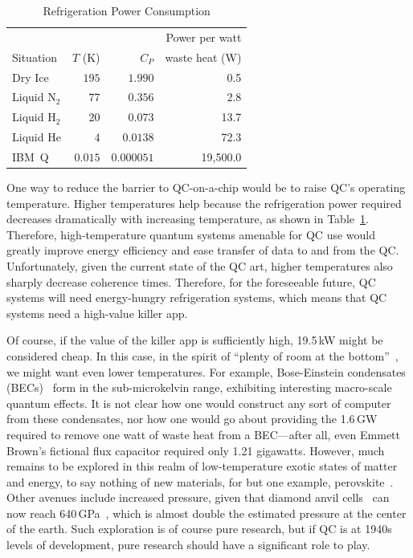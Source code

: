 \begin{table}
\centering\footnotesize
\begin{tabular}{l|r|r|r}
	&	&	& Power per watt \\
Situation
	& $T$ (K)
		& $C_P$	& waste heat (W) \\
\hline
\hline
Dry Ice
	& $195$
		& $1.990$
			& 0.5 \\
\hline
Liquid N$_2$
	& $77$
		& $0.356$
			& 2.8 \\
\hline
Liquid H$_2$
	& $20$
		& $0.073$
			& 13.7 \\
\hline
Liquid He
	& $4$
		& $0.0138$
			& 72.3 \\
\hline
IBM~Q	& $0.015$
		& $0.000051$
			& 19,500.0 \\
\end{tabular}
\caption{Refrigeration Power Consumption}
\label{tab:future:Refrigeration Power Consumption}
\end{table}

One way to reduce the barrier to QC-on-a-chip would be to raise
QC's operating temperature.
Higher temperatures help because the refrigeration power required
decreases dramatically with increasing temperature, as shown in
Table~\ref{tab:future:Refrigeration Power Consumption}.
Therefore, high-temperature quantum systems amenable for QC use would
greatly improve energy efficiency and ease transfer of data to and from
the QC.
Unfortunately, given the current state of the QC art, higher
temperatures also sharply decrease coherence times.
Therefore, for the foreseeable future, QC systems will need
energy-hungry refrigeration systems, which means that QC
systems need a high-value killer app.

Of course, if the value of the killer app is sufficiently high,
19.5\,kW might be considered cheap.
In this case, in the spirit of
``plenty of room at the bottom''~\cite{RichardPFeynman1959RoomAtBottom},
we might want even lower temperatures.
For example, Bose-Einstein condensates
(BECs)~\cite{NIST2001BoseEinsteinCondensate}
form in the sub-microkelvin range, exhibiting interesting
macro-scale quantum effects.
It is not clear how one would construct any sort of computer from
these condensates, nor how one would go about providing the 1.6\,GW
required to remove one watt of waste heat from a BEC---after all,
even Emmett Brown's fictional flux capacitor required only 1.21 gigawatts.
However, much remains to be explored in this realm
of low-temperature exotic states of matter and energy, to say
nothing of new materials, for but one example,
perovskite~\cite{ZhengChen2016PerovskiteQDMOFthinFilm}.
Other avenues include increased pressure, given that diamond anvil
cells~\cite{Weir1959DiamondAnvilCell} can now reach
640\,GPa~\cite{LeonidDubrovinsky2012640GPaDiamondAnvilCell},
which is almost double the estimated pressure at the center of the earth.
Such exploration is of course pure research, but if QC is at 1940s levels
of development, pure research should have a significant role to play.

